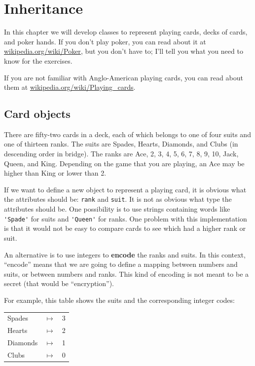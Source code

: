 \documentclass[10pt]{book}
\begin{document}
\chapter{Inheritance}

In this chapter we will develop classes to represent playing cards,
decks of cards, and poker hands.  If you don't play poker, you can
read about it at \url{wikipedia.org/wiki/Poker}, but you don't have
to; I'll tell you what you need to know for the exercises.


If you are not familiar with Anglo-American playing cards,
you can read about them at \url{wikipedia.org/wiki/Playing_cards}.


\section{Card objects}

There are fifty-two cards in a deck, each of which belongs to one of
four suits and one of thirteen ranks.  The suits are Spades, Hearts,
Diamonds, and Clubs (in descending order in bridge).  The ranks are
Ace, 2, 3, 4, 5, 6, 7, 8, 9, 10, Jack, Queen, and King.  Depending on
the game that you are playing, an Ace may be higher than King
or lower than 2.


If we want to define a new object to represent a playing card, it is
obvious what the attributes should be: {\tt rank} and
{\tt suit}.  It is not as obvious what type the attributes
should be.  One possibility is to use strings containing words like
\verb"'Spade'" for suits and \verb"'Queen'" for ranks.  One problem with
this implementation is that it would not be easy to compare cards to
see which had a higher rank or suit.


An alternative is to use integers to {\bf encode} the ranks and suits.
In this context, ``encode'' means that we are going to define a mapping
between numbers and suits, or between numbers and ranks.  This
kind of encoding is not meant to be a secret (that
would be ``encryption'').

For example, this table shows the suits and the corresponding integer
codes:

\beforefig
\begin{tabular}{l c l}
Spades & $\mapsto$ & 3 \\
Hearts & $\mapsto$ & 2 \\
Diamonds & $\mapsto$ & 1 \\
Clubs & $\mapsto$ & 0
\end{tabular}
\afterfig
\end{document}
